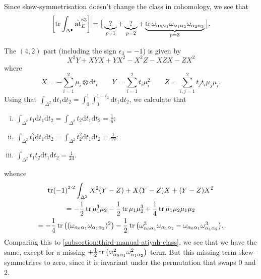 \documentclass[11pt,fleqn]{article}
\theoremstyle{plain}
\theoremstyle{definition}
\theoremstyle{remark}
\numberwithin{equation}{theorem}
\newcommand{\at}{\mathrm{at}}
\newcommand{\simpexpat}[1]{\hat{\at}^{\circ#1}}
\renewcommand{\d}{\mathrm{d}}
\begin{document}
        Since skew-symmetrisation doesn't change the class in cohomology, we see that
        \begin{equation}
            \left[\tr\int_{\Delta^\bullet}\simpexpat{3}_E\right] = \big[\underbrace{?}_{p=1} + \underbrace{?}_{p=2} + \underbrace{\tr\omega_{\alpha_0\alpha_1}\omega_{\alpha_1\alpha_2}\omega_{\alpha_2\alpha_3}}_{p=3}\big].
        \end{equation}

        The $(4,2)$ part (including the sign $\epsilon_3=-1$) is given by
        \begin{equation}
            X^2Y + XYX + YX^2 - X^2Z - XZX - ZX^2
        \end{equation}
        where
        \begin{equation}
            X = -\sum_{i=1}^2\mu_i\otimes\d t_i\qquad
            Y = \sum_{i=1}^2 t_i\mu_i^2\qquad
            Z = \sum_{i,j=1}^2 t_j t_i\mu_j\mu_i.
        \end{equation}
        Using that $\int_{\Delta^2}\d t_1\d t_2=\int_0^1\int_0^{1-t_2}\d t_1\d t_2$, we calculate that
        \begin{enumerate}[(i)]
            \item $\int_{\Delta^2}t_1\d t_1\d t_2=\int_{\Delta^2}t_2\d t_1\d t_2=\frac16$;
            \item $\int_{\Delta^2}t_1^2\d t_1\d t_2=\int_{\Delta^2}t_2^2\d t_1\d t_2=\frac{1}{12}$;
            \item $\int_{\Delta^2}t_1t_2\d t_1\d t_2=\frac{1}{24}$.
        \end{enumerate}
        whence
        \begin{gather}
            \tr(-1)^{2\cdot2}\int_{\Delta^2}X^2(Y-Z) + X(Y-Z)X + (Y-Z)X^2
        \nonumber
        \\  = -\frac12\tr\mu_1^3\mu_2 - \frac12\tr\mu_1\mu_2^3 + \frac14\tr\mu_1\mu_2\mu_1\mu_2
        \nonumber
        \\  = -\frac14\tr\big((\omega_{\alpha_0\alpha_1}\omega_{\alpha_1\alpha_2})^2\big) - \frac12\tr\big(\omega_{\alpha_0\alpha_1}^3\omega_{\alpha_1\alpha_2} - \omega_{\alpha_0\alpha_1}\omega_{\alpha_1\alpha_2}^3\big).
        \end{gather}
        Comparing this to \cref{subsection:third-manual-atiyah-class}, we see that we have the same, except for a missing $+\frac12\tr\left(\omega_{\alpha_0\alpha_1}^2\omega_{\alpha_1\alpha_2}^2\right)$ term.
        But this missing term skew-symmetrises to zero, since it is invariant under the permutation that swaps $0$ and $2$.
\end{document}
